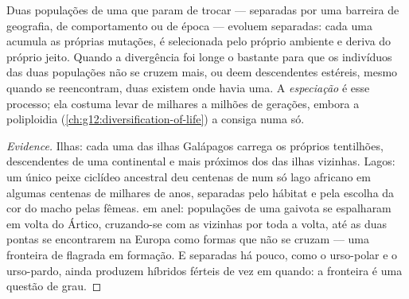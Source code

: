 \begin{proposition}[Especiação]\label{prop:g12:selection-drift-speciation:speciation}
Duas populações de uma  que param de trocar  --- separadas
por uma barreira de geografia, de comportamento ou de época ---
evoluem separadas: cada uma acumula as próprias mutações, é selecionada
pelo próprio ambiente e deriva do próprio jeito. Quando a divergência
foi longe o bastante para que os indivíduos das duas populações não se
cruzem mais, ou deem descendentes estéreis, mesmo quando se reencontram,
duas  existem onde havia uma. A \emph{especiação}
é esse processo; ela costuma levar de milhares a milhões de gerações,
embora a poliploidia (\cref{ch:g12:diversification-of-life}) a
consiga numa só.
\end{proposition}
\begin{proof}[Evidence]
Ilhas: cada uma das ilhas Galápagos carrega os próprios tentilhões,
descendentes de uma  continental e mais próximos dos das ilhas
vizinhas. Lagos: um único peixe ciclídeo ancestral deu centenas de
 num só lago africano em algumas centenas de milhares de anos,
separadas pelo hábitat e pela escolha da cor do macho pelas fêmeas.
 em anel: populações de uma gaivota se espalharam em volta do
Ártico, cruzando-se com as vizinhas por toda a volta, até as duas
pontas se encontrarem na Europa como formas que não se cruzam --- uma
fronteira de  flagrada em formação. E  separadas há
pouco, como o urso-polar e o urso-pardo, ainda produzem híbridos
férteis de vez em quando: a fronteira é uma questão de grau.
\end{proof}

